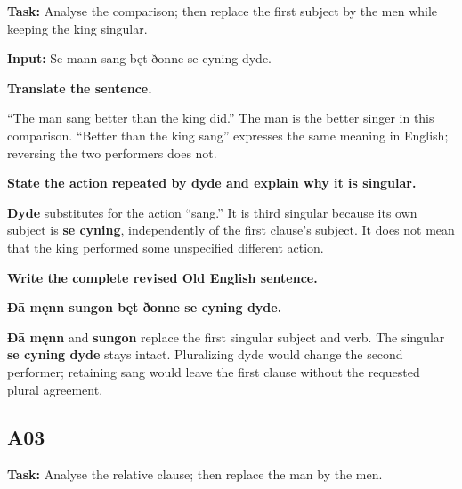\textbf{Task:} Analyse the comparison; then replace the first subject by the men while keeping the king singular.

\textbf{Input:} Se mann sang bęt ðonne se cyning dyde.

\textbf{Translate the sentence.}

“The man sang better than the king did.” The man is the better singer in this comparison. “Better than the king sang” expresses the same meaning in English; reversing the two performers does not.

\textbf{State the action repeated by dyde and explain why it is singular.}

\textbf{Dyde} substitutes for the action “sang.” It is third singular because its own subject is \textbf{se cyning}, independently of the first clause's subject. It does not mean that the king performed some unspecified different action.

\textbf{Write the complete revised Old English sentence.}

\textbf{Ðā męnn sungon bęt ðonne se cyning dyde.}

\textbf{Ðā męnn} and \textbf{sungon} replace the first singular subject and verb. The singular \textbf{se cyning dyde} stays intact. Pluralizing dyde would change the second performer; retaining sang would leave the first clause without the requested plural agreement.

\subsection*{A03}

\textbf{Task:} Analyse the relative clause; then replace the man by the men.

